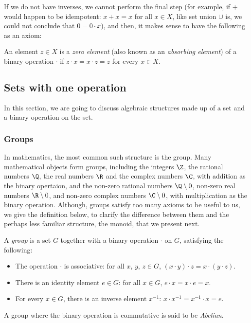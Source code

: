 If we do not have inverses, we cannot perform the final step (for example, if $+$ would happen to be idempotent: $x + x = x$ for all $x \in X$, like set union $\cup$ is, we could not conclude that $0 = 0 \cdot x$), and then, it makes sense to have the following as an axiom:
\begin{Definition}
  An element $z \in X$ is a \emph{zero element} (also known as an \emph{absorbing element}) of a binary operation $\cdot$ if $z \cdot x = x \cdot z = z$ for every $x \in X$.
\end{Definition}

\subsection{Sets with one operation} %
\label{Set-with-one-op}
In this section, we are going to discuss algebraic structures made up of a set and a binary operation on the set.
\subsubsection{Groups}
In mathematics, the most common such structure is the group. Many mathematical objects form groups, including the integers $\Z$, the rational numbers $\Q$, the real numbers $\R$ and the complex numbers $\C$, with addition as the binary opertaion, and the non-zero rational numbers $\Q\setminus{0}$, non-zero real numbers $\R\setminus{0}$, and non-zero complex numbers $\C\setminus{0}$, with multiplication as the binary operation. Although, groups satisfy too many axioms to be useful to us, we give the definition below, to clarify the difference between them and the perhaps less familiar structure, the monoid, that we present next.
\begin{Definition}
A \emph{group} is a set $G$ together with a binary operation $\cdot$ on $G$, satisfying the following:
\begin{itemize}
\item The operation $\cdot$ is associative: for all $x$, $y$, $z \in G$, $(x \cdot y) \cdot z = x \cdot (y \cdot z)$. 
\item There is an identity element $e \in G$: for all $x \in G$, $e \cdot x = x \cdot e = x$.
\item For every $x \in G$, there is an inverse element $x^{-1}$: $x \cdot x^{-1} = x^{-1} \cdot x = e$.
\end{itemize}
A group where the binary operation is commutative is said to be \emph{Abelian}.
\end{Definition}


